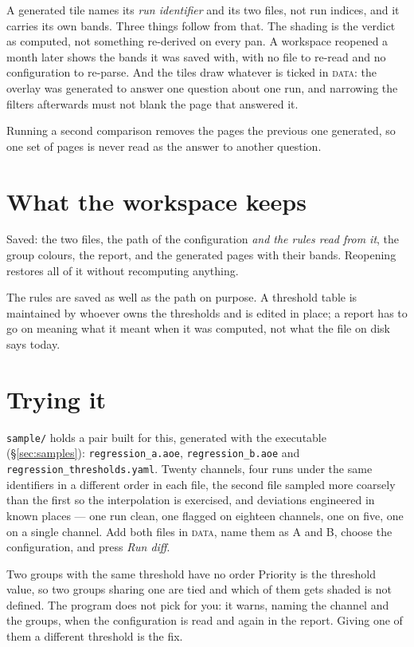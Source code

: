 \documentclass[11pt,a4paper,oneside]{report}
\newcommand{\code}[1]{\texttt{#1}}
\newcommand{\tab}[1]{\textsc{#1}}
\begin{document}
A generated tile names its \emph{run identifier} and its two files, not run
indices, and it carries its own bands. Three things follow from that. The
shading is the verdict as computed, not something re-derived on every pan. A
workspace reopened a month later shows the bands it was saved with, with no
file to re-read and no configuration to re-parse. And the tiles draw whatever
is ticked in \tab{data}: the overlay was generated to answer one question about
one run, and narrowing the filters afterwards must not blank the page that
answered it.

Running a second comparison removes the pages the previous one generated, so
one set of pages is never read as the answer to another question.

\section{What the workspace keeps}

Saved: the two files, the path of the configuration \emph{and the rules read
from it}, the group colours, the report, and the generated pages with their
bands. Reopening restores all of it without recomputing anything.

The rules are saved as well as the path on purpose. A threshold table is
maintained by whoever owns the thresholds and is edited in place; a report has
to go on meaning what it meant when it was computed, not what the file on disk
says today.

\section{Trying it}

\code{sample/} holds a pair built for this, generated with the executable
(\S\ref{sec:samples}): \code{regression\_a.aoe}, \code{regression\_b.aoe} and
\code{regression\_thresholds.yaml}. Twenty channels, four runs under the same
identifiers in a different order in each file, the second file sampled more
coarsely than the first so the interpolation is exercised, and deviations
engineered in known places --- one run clean, one flagged on eighteen channels,
one on five, one on a single channel. Add both files in \tab{data}, name them
as A and B, choose the configuration, and press \emph{Run diff}.

\begin{aoelimit}{Two groups with the same threshold have no order}
Priority is the threshold value, so two groups sharing one are tied and which
of them gets shaded is not defined. The program does not pick for you: it
warns, naming the channel and the groups, when the configuration is read and
again in the report. Giving one of them a different threshold is the fix.
\end{aoelimit}
\end{document}

